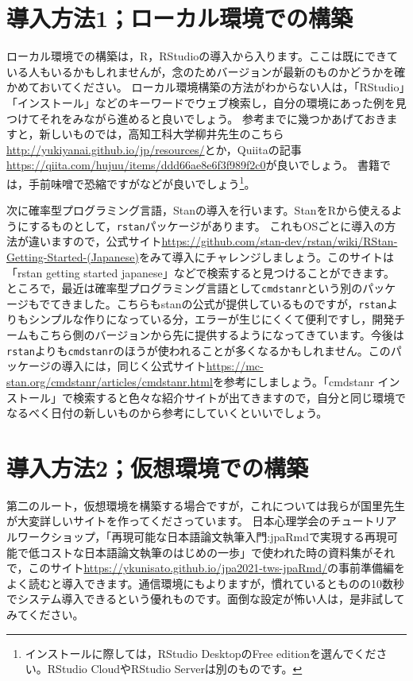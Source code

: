 \documentclass{ltjsbook}
\begin{document}
\section{導入方法1；ローカル環境での構築}

ローカル環境での構築は，R，RStudioの導入から入ります。ここは既にできている人もいるかもしれませんが，念のためバージョンが最新のものかどうかを確かめておいてください。
ローカル環境構築の方法がわからない人は，「RStudio」「インストール」などのキーワードでウェブ検索し，自分の環境にあった例を見つけてそれをみながら進めると良いでしょう。
参考までに幾つかあげておきますと，新しいものでは，高知工科大学柳井先生のこちら\url{http://yukiyanai.github.io/jp/resources/}とか，Quiitaの記事\url{https://qiita.com/hujuu/items/ddd66ae8e6f3f989f2c0}が良いでしょう。
書籍では，手前味噌で恐縮ですが\citet{kosugi2019}などが良いでしょう\footnote{インストールに際しては，RStudio DesktopのFree editionを選んでください。RStudio CloudやRStudio Serverは別のものです。}。

次に確率型プログラミング言語，Stanの導入を行います。StanをRから使えるようにするものとして，\texttt{rstan}パッケージがあります。
これもOSごとに導入の方法が違いますので，公式サイト\url{https://github.com/stan-dev/rstan/wiki/RStan-Getting-Started-(Japanese)}をみて導入にチャレンジしましょう。このサイトは「rstan getting started japanese」などで検索すると見つけることができます。
ところで，最近は確率型プログラミング言語として\texttt{cmdstanr}という別のパッケージもでてきました。こちらもstanの公式が提供しているものですが，\texttt{rstan}よりもシンプルな作りになっている分，エラーが生じにくくて便利ですし，開発チームもこちら側のバージョンから先に提供するようになってきています。今後は\texttt{rstan}よりも\texttt{cmdstanr}のほうが使われることが多くなるかもしれません。このパッケージの導入には，同じく公式サイト\url{https://mc-stan.org/cmdstanr/articles/cmdstanr.html}を参考にしましょう。「cmdstanr インストール」で検索すると色々な紹介サイトが出てきますので，自分と同じ環境でなるべく日付の新しいものから参考にしていくといいでしょう。

\section{導入方法2；仮想環境での構築}

第二のルート，仮想環境を構築する場合ですが，これについては我らが国里先生が大変詳しいサイトを作ってくださっています。
日本心理学会のチュートリアルワークショップ，「再現可能な日本語論文執筆入門:jpaRmdで実現する再現可能で低コストな日本語論文執筆のはじめの一歩」で使われた時の資料集がそれで，このサイト\url{https://ykunisato.github.io/jpa2021-tws-jpaRmd/}の事前準備編をよく読むと導入できます。通信環境にもよりますが，慣れているとものの10数秒でシステム導入できるという優れものです。面倒な設定が怖い人は，是非試してみてください。
\end{document}
